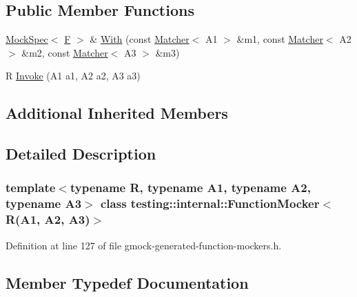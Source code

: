 \subsection*{Public Member Functions}
\begin{DoxyCompactItemize}
\item 
\hyperlink{classtesting_1_1internal_1_1MockSpec}{Mock\+Spec}$<$ \hyperlink{classtesting_1_1internal_1_1FunctionMocker_3_01R_07A1_00_01A2_00_01A3_08_4_a8c471830f963b8012785eb3eeca2cc9c}{F} $>$ \& \hyperlink{classtesting_1_1internal_1_1FunctionMocker_3_01R_07A1_00_01A2_00_01A3_08_4_a349af66650c6d0401dd1c0081773c25a}{With} (const \hyperlink{classtesting_1_1Matcher}{Matcher}$<$ A1 $>$ \&m1, const \hyperlink{classtesting_1_1Matcher}{Matcher}$<$ A2 $>$ \&m2, const \hyperlink{classtesting_1_1Matcher}{Matcher}$<$ A3 $>$ \&m3)
\item 
R \hyperlink{classtesting_1_1internal_1_1FunctionMocker_3_01R_07A1_00_01A2_00_01A3_08_4_a2afad9e39ca64acc6b178fa415907c5b}{Invoke} (A1 a1, A2 a2, A3 a3)
\end{DoxyCompactItemize}
\subsection*{Additional Inherited Members}


\subsection{Detailed Description}
\subsubsection*{template$<$typename R, typename A1, typename A2, typename A3$>$\newline
class testing\+::internal\+::\+Function\+Mocker$<$ R(\+A1, A2, A3)$>$}



Definition at line 127 of file gmock-\/generated-\/function-\/mockers.\+h.



\subsection{Member Typedef Documentation}
\mbox{\label{classtesting_1_1internal_1_1FunctionMocker_3_01R_07A1_00_01A2_00_01A3_08_4_a347dcf4c054a5f1fbd0e2f0ad1c5e2f3}} 
